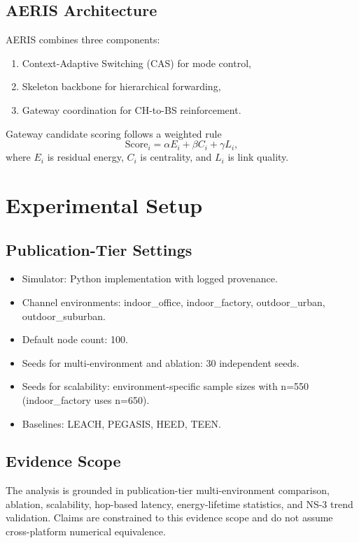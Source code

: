 \documentclass[sensors,article,submit,moreauthors,pdftex]{Definitions/mdpi}
\begin{document}
\subsection{AERIS Architecture}
AERIS combines three components:
\begin{enumerate}
\item Context-Adaptive Switching (CAS) for mode control,
\item Skeleton backbone for hierarchical forwarding,
\item Gateway coordination for CH-to-BS reinforcement.
\end{enumerate}
Gateway candidate scoring follows a weighted rule
\begin{equation}
\mathrm{Score}_i = \alpha E_i + \beta C_i + \gamma L_i,
\end{equation}
where $E_i$ is residual energy, $C_i$ is centrality, and $L_i$ is link quality.

\section{Experimental Setup}
\subsection{Publication-Tier Settings}
\begin{itemize}
\item Simulator: Python implementation with logged provenance.
\item Channel environments: indoor\_office, indoor\_factory, outdoor\_urban, outdoor\_suburban.
\item Default node count: 100.
\item Seeds for multi-environment and ablation: 30 independent seeds.
\item Seeds for scalability: environment-specific sample sizes with n=550 (indoor\_factory uses n=650).
\item Baselines: LEACH, PEGASIS, HEED, TEEN.
\end{itemize}

\subsection{Evidence Scope}
The analysis is grounded in publication-tier multi-environment comparison, ablation, scalability, hop-based latency, energy-lifetime statistics, and NS-3 trend validation. Claims are constrained to this evidence scope and do not assume cross-platform numerical equivalence.
\end{document}
